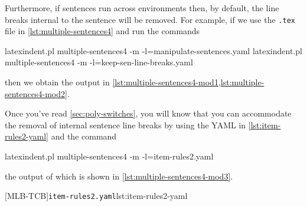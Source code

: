  \begin{example}
 Furthermore, if sentences run across environments then, by default, the line breaks
 internal to the sentence will be removed. For example, if we use the \texttt{.tex} file
 in \cref{lst:multiple-sentences4} and run the commands 

 \begin{commandshell}
latexindent.pl multiple-sentences4 -m -l=manipulate-sentences.yaml
latexindent.pl multiple-sentences4 -m -l=keep-sen-line-breaks.yaml
\end{commandshell}

 then we obtain the output in
 \cref{lst:multiple-sentences4-mod1,lst:multiple-sentences4-mod2}.
 \begin{widepage}
 \end{widepage}
 \end{example}

 \begin{example}
 Once you've read \cref{sec:poly-switches}, you will know that you can accommodate the
 removal of internal sentence line breaks by using the YAML in
 \cref{lst:item-rules2-yaml} and the command 

 \begin{commandshell}
latexindent.pl multiple-sentences4 -m -l=item-rules2.yaml
\end{commandshell}

 the output of which is shown in \cref{lst:multiple-sentences4-mod3}.

 \begin{cmhtcbraster}
  [MLB-TCB]{\texttt{item-rules2.yaml}}{lst:item-rules2-yaml}
 \end{cmhtcbraster}
 \end{example}


